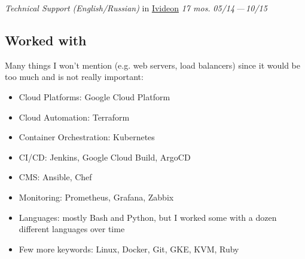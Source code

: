 \documentclass[11pt, a4paper]{article}
\newcommand{\Delimitline}{
  \vspace{-2ex}
  \noindent\makebox[\linewidth]{\rule{\DelimitlineLength}{0.12ex}} }
\newcommand{\forceindent}{\leavevmode{\parindent=1em\indent}}
\begin{document}
\begin{etaremune}[
  topsep=1ex,itemsep=1.5ex,partopsep=0ex,
  parsep=0ex,rightmargin=1em,leftmargin=2em
]
  \item
    \emph{Technical Support (English/Russian)}\hfill
    in \href{https://ivideon.com}{Ivideon}\hspace{1.0em}
    \textit{17 mos.}\hspace{1.0em}
    \textit{05/14\,—\,10/15}
\end{etaremune}

\vspace{0ex}


\subsection*{Worked with\vphantom{ (skills)}}
\Delimitline

\forceindent Many things I won't mention (e.g. web servers, load balancers) since it would be too much and is not really important:
\begin{itemize}
  \item Cloud Platforms: Google Cloud Platform
  \item Cloud Automation: Terraform
  \item Container Orchestration: Kubernetes
  \item CI/CD: Jenkins, Google Cloud Build, ArgoCD
  \item CMS: Ansible, Chef
  \item Monitoring: Prometheus, Grafana, Zabbix
  \item Languages: mostly Bash and Python, but I worked some with a dozen different languages over time
  \item Few more keywords: Linux, Docker, Git, GKE, KVM, Ruby
\end{itemize}


\subsection*{\vphantom{Education: }}
\vphantom{ middle school}
\end{document}
